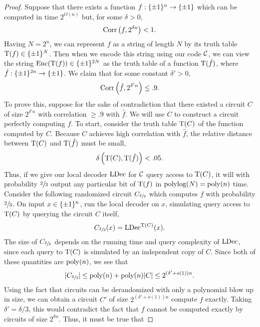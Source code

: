 \documentclass[11pt]{article}
\begin{document}
\begin{proof}

    Suppose that there exists a function $f : \{\pm 1\}^n \rightarrow \{\pm 1\}$ which can be computed in time $2^{O(n)}$ but, for some $\delta > 0$, 
    \begin{equation*}
        \mathrm{Corr}\left(f, 2^{\delta n}\right) < 1.
    \end{equation*}
    Having $N = 2^n$, we can represent $f$ as a string of length $N$ by its truth table $\mathrm{T}(f) \in \{\pm 1\}^N$. Then when we encode this string using our code $\mathcal{C}$, we can view the string $\mathrm{Enc}(\mathrm{T}(f)) \in \{\pm 1\}^{2N}$ as the truth table of a function $\mathrm{T}(\hat{f})$, where $\hat{f} : \{\pm 1\}^{2n} \rightarrow \{\pm 1\}$. We claim that for some constant $\delta' > 0$,
    \begin{equation*}
        \mathrm{Corr}\left(\hat{f}, 2^{\delta' n}\right) \leq .9.
    \end{equation*}
    To prove this, suppose for the sake of contradiction that there existed a circuit $C$ of size $2^{\delta' n}$ with correlation $\geq .9$ with $\hat{f}$. We will use $C$ to construct a circuit perfectly computing $f$. To start, consider the truth table $\mathrm{T}(C)$ of the function computed by $C$. Because $C$ achieves high correlation with $\hat{f}$, the relative distance between $\mathrm{T}(C)$ and $\mathrm{T}(\hat{f})$ must be small,
    \begin{equation*}
        \delta\left(\mathrm{T}(C), \mathrm{T}(\hat{f})\right) < .05.
    \end{equation*}
    Thus, if we give our local decoder ${\textup{LDec}}$ for $\mathcal{C}$ query access to $\mathrm{T}(C)$, it will with probability $\sfrac{2}{3}$ output any particular bit of $\mathrm{T}(f)$ in $\mathrm{polylog}(N) = \mathrm{poly}(n)$ time. Consider the following randomized circuit $C_{\sfrac{2}{3}}$ which computes $f$ with probability $\sfrac{2}{3}$. On input $x \in \{\pm 1\}^n$, run the local decoder on $x$, simulating query access to $\mathrm{T}(C)$ by querying the circuit $C$ itself,
    \begin{equation*}
        C_{\sfrac{2}{3}}(x) = {\textup{LDec}}^{\mathrm{T}(C)}(x).
    \end{equation*}
    The size of $C_{\sfrac{2}{3}}$ depends on the running time and query complexity of ${\textup{LDec}}$, since each query to $\mathrm{T}(C)$ is simulated by an independent copy of $C$. Since both of these quantities are $\mathrm{poly}(n)$, we see that 
    \begin{equation*}
        |C_{\sfrac{2}{3}}|  \leq \mathrm{poly}(n) + \mathrm{poly}(n) |C| \leq 2^{(\delta' + o(1))n}.
    \end{equation*}
    Using the fact that circuits can be derandomized with only a polynomial blow up in size, we can obtain a circuit $C'$ of size $2^{(\delta' + o(1))n}$ compute $f$ exactly. Taking $\delta' = \delta / 3$, this would contradict the fact that $f$ cannot be computed exactly by circuits of size $2^{\delta n}$. Thus, it must be true that 

\end{proof}
\end{document}
